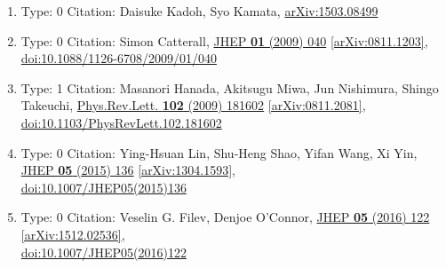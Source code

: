 \documentclass[a4paper,10pt]{article}
\begin{document}
\begin{enumerate}
\begin{enumerate}
  \item Type: 0 Citation: Daisuke Kadoh, Syo Kamata, \href{https://arxiv.org/abs/1503.08499}{arXiv:1503.08499}
  \item Type: 0 Citation: Simon Catterall, \href{https://www.doi.org/10.1088/1126-6708/2009/01/040}{JHEP {\bf 01} (2009) 040}  \href{https://arxiv.org/abs/0811.1203}{[arXiv:0811.1203]},\\\href{https://www.doi.org/10.1088/1126-6708/2009/01/040}{doi:10.1088/1126-6708/2009/01/040}
  \item Type: 1 Citation: Masanori Hanada, Akitsugu Miwa, Jun Nishimura, Shingo Takeuchi, \href{https://www.doi.org/10.1103/PhysRevLett.102.181602}{Phys.Rev.Lett. {\bf 102} (2009) 181602}  \href{https://arxiv.org/abs/0811.2081}{[arXiv:0811.2081]},\\\href{https://www.doi.org/10.1103/PhysRevLett.102.181602}{doi:10.1103/PhysRevLett.102.181602}
  \item Type: 0 Citation: Ying-Hsuan Lin, Shu-Heng Shao, Yifan Wang, Xi Yin, \href{https://www.doi.org/10.1007/JHEP05(2015)136}{JHEP {\bf 05} (2015) 136}  \href{https://arxiv.org/abs/1304.1593}{[arXiv:1304.1593]},\\\href{https://www.doi.org/10.1007/JHEP05(2015)136}{doi:10.1007/JHEP05(2015)136}
  \item Type: 0 Citation: Veselin G. Filev, Denjoe O'Connor, \href{https://www.doi.org/10.1007/JHEP05(2016)122}{JHEP {\bf 05} (2016) 122}  \href{https://arxiv.org/abs/1512.02536}{[arXiv:1512.02536]},\\\href{https://www.doi.org/10.1007/JHEP05(2016)122}{doi:10.1007/JHEP05(2016)122}

\end{enumerate}
\end{enumerate}
\end{document}
